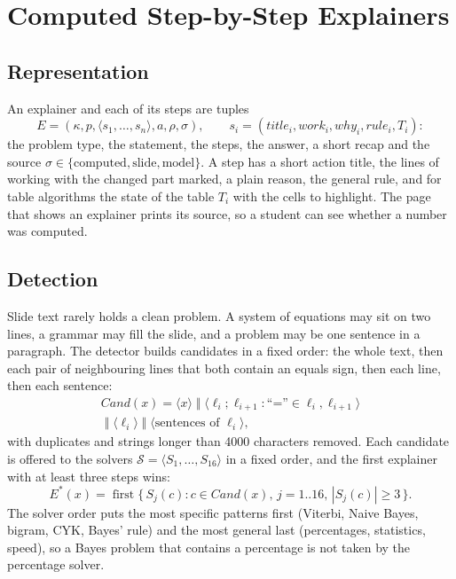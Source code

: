 \documentclass[runningheads]{llncs}
\begin{document}
\section{Computed Step-by-Step Explainers}
\label{sec:explain}
\subsection{Representation}
An explainer and each of its steps are tuples
\begin{equation}
E = (\kappa, p, \langle s_1,\dots,s_n\rangle, a, \rho, \sigma), \qquad
s_i = (\mathit{title}_i, \mathit{work}_i, \mathit{why}_i, \mathit{rule}_i, T_i):
\end{equation}
the problem type, the statement, the steps, the answer, a short recap and the source
$\sigma \in \{\text{computed}, \text{slide}, \text{model}\}$. A step has a short action title, the lines of working
with the changed part marked, a plain reason, the general rule, and for table algorithms the state of the table $T_i$ with the
cells to highlight. The page that shows an explainer prints its source, so a student can see whether a number was computed.

\subsection{Detection}
Slide text rarely holds a clean problem. A system of equations may sit on two lines, a grammar may fill the slide, and a
problem may be one sentence in a paragraph. The detector builds candidates in a fixed order: the whole text, then each pair of
neighbouring lines that both contain an equals sign, then each line, then each sentence:
\begin{multline}
\mathit{Cand}(x) = \langle x \rangle \;\Vert\; \langle \ell_i ; \ell_{i+1} : \text{``=''} \in \ell_i, \ell_{i+1} \rangle \\
\;\Vert\; \langle \ell_i \rangle \;\Vert\; \langle \text{sentences of } \ell_i \rangle,
\end{multline}
with duplicates and strings longer than 4000 characters removed. Each candidate is offered to the solvers
$\mathcal{S} = \langle S_1, \dots, S_{16} \rangle$ in a fixed order, and the first explainer with at least three steps wins:
\begin{equation}
\label{eq:first}
E^{*}(x) = \operatorname{first}\{\, S_j(c) : c \in \mathit{Cand}(x),\, j = 1..16,\, |S_j(c)| \ge 3 \,\}.
\end{equation}
The solver order puts the most specific patterns first (Viterbi, Naive Bayes, bigram, CYK, Bayes' rule) and the most general
last (percentages, statistics, speed), so a Bayes problem that contains a percentage is not taken by the percentage solver.
\end{document}

